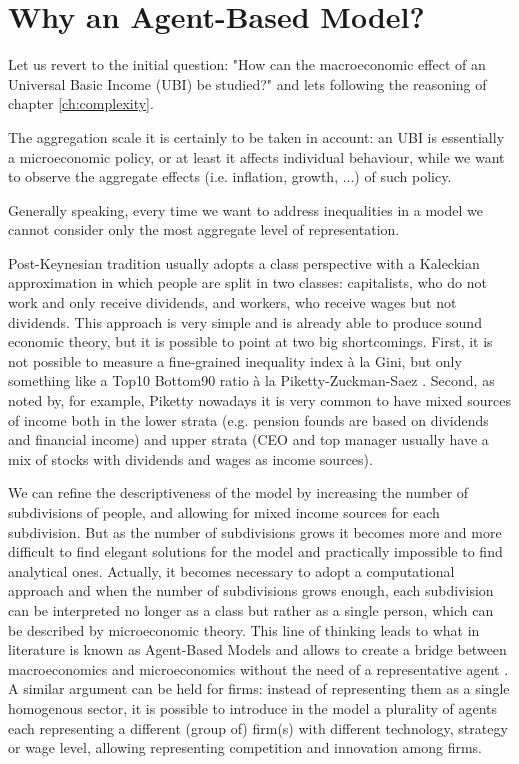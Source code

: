\chapter{Why an Agent-Based Model?}
\label{ch:why}
Let us revert to the initial question: "How can the macroeconomic effect of an Universal Basic Income (UBI) be studied?" and lets following the reasoning of chapter \ref{ch:complexity}.

The aggregation scale it is certainly to be taken in account: an UBI is essentially a microeconomic policy, or at least it affects individual behaviour, while we want to observe the aggregate effects (i.e. inflation, growth, ...) of such policy.

Generally speaking, every time we want to address inequalities in a model we cannot consider only the most aggregate level of representation.

Post-Keynesian tradition usually adopts a class perspective with a Kaleckian approximation in which people are split in two classes: capitalists, who do not work and only receive dividends, and workers, who receive wages but not dividends.
This approach is very simple and is already able to produce sound economic theory, but it is possible to point at two big shortcomings.
First, it is not possible to measure a fine-grained inequality index à la Gini, but only something like a Top10 Bottom90 ratio à la Piketty-Zuckman-Saez \parencite{piketty2003, piketty2014}.
Second, as noted by, for example, Piketty nowadays it is very common to have mixed sources of income both in the lower strata (e.g. pension founds are based on dividends and financial income) and upper strata (CEO and top manager usually have a mix of stocks with dividends and wages as income sources).

We can refine the descriptiveness of the model by increasing the number of subdivisions of people, and allowing for mixed income sources for each subdivision.
But as the number of subdivisions grows it becomes more and more difficult to find elegant solutions for the model and practically impossible to find analytical ones.
Actually, it becomes necessary to adopt a computational approach \parencite{tesfatsion2006a} and when the number of subdivisions grows enough, each subdivision can be interpreted no longer as a class but rather as a single person, which can be described by microeconomic theory.
This line of thinking leads to what in literature is known as Agent-Based Models \parencite{arthur2021, farmer2012} and allows to create a bridge between macroeconomics and microeconomics without the need of a representative agent \parencite{dosi2019}.
A similar argument can be held for firms: instead of representing them as a single homogenous sector, it is possible to introduce in the model a plurality of agents each representing a different (group of) firm(s) with different technology, strategy or wage level, allowing representing competition and innovation among firms.

